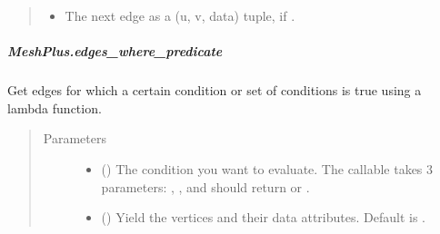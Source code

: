\documentclass[letterpaper,10pt,english]{sphinxmanual}
\begin{document}
\begin{fulllineitems}
\begin{fulllineitems}
\begin{quote}
\begin{description}
\begin{itemize}
\item {} 
 \textendash{} The next edge as a (u, v, data) tuple, if .

\end{itemize}

\end{description}\end{quote}

\end{fulllineitems}



\subparagraph{MeshPlus.edges\_where\_predicate}
\label{\detokenize{api/generated/directional_clustering.mesh.MeshPlus.edges_where_predicate:meshplus-edges-where-predicate}}\label{\detokenize{api/generated/directional_clustering.mesh.MeshPlus.edges_where_predicate::doc}}

\begin{fulllineitems}
\label{\detokenize{api/generated/directional_clustering.mesh.MeshPlus.edges_where_predicate:directional_clustering.mesh.MeshPlus.edges_where_predicate}}
Get edges for which a certain condition or set of conditions is true using a lambda function.
\begin{quote}\begin{description}
\item[{Parameters}] \leavevmode\begin{itemize}
\item {} 
 () \textendash{} The condition you want to evaluate. The callable takes 3 parameters: , ,  and should return  or .

\item {} 
 () \textendash{} Yield the vertices and their data attributes.
Default is .

\end{itemize}


\end{description}
\end{quote}
\end{fulllineitems}
\end{fulllineitems}
\end{document}
